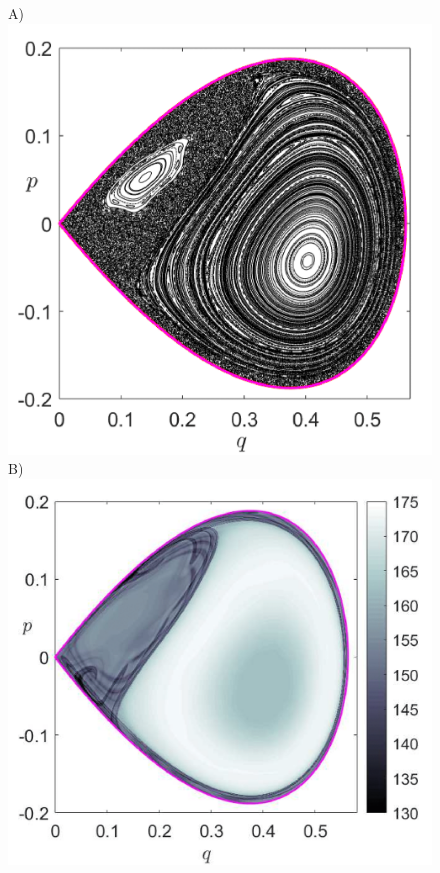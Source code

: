 \documentclass[8pt]{article}
\begin{document}
\begin{figure}[!ht]
	\begin{center}		
		A)\includegraphics[scale=0.13]{fig10a.png}	
		B)\includegraphics[scale=0.13]{fig10b.png}

\end{center}
\end{figure}
\end{document}
